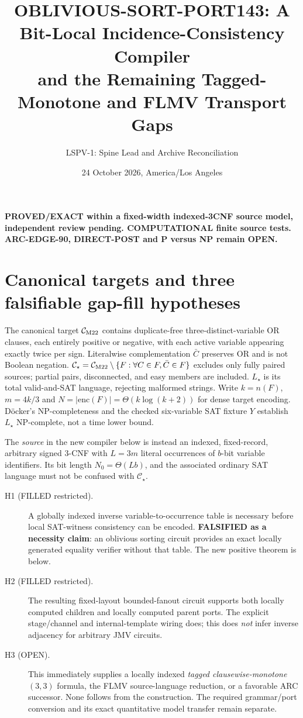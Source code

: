 \documentclass[11pt]{article}
\title{OBLIVIOUS-SORT-PORT143: A Bit-Local Incidence-Consistency Compiler\\
and the Remaining Tagged-Monotone and FLMV Transport Gaps}
\author{LSPV-1: Spine Lead and Archive Reconciliation}
\date{24 October 2026, America/Los Angeles}
\begin{document}
\maketitle
\begin{center}
\textbf{PROVED/EXACT within a fixed-width indexed-3CNF source model, independent review pending. COMPUTATIONAL finite source tests.}\\
\textbf{ARC-EDGE-90, DIRECT-POST and P versus NP remain OPEN.}
\end{center}

\section{Canonical targets and three falsifiable gap-fill hypotheses}
The canonical target $\mathcal C_{\rm M22}$ contains duplicate-free three-distinct-variable OR clauses, each entirely positive or negative, with each active variable appearing exactly twice per sign. Literalwise complementation $\bar C$ preserves OR and is not Boolean negation. $\mathcal C_\star=\mathcal C_{\rm M22}\setminus\{F:\forall C\in F,\bar C\in F\}$ excludes only fully paired sources; partial pairs, disconnected, and easy members are included. $L_\star$ is its total valid-and-SAT language, rejecting malformed strings. Write $k=n(F)$, $m=4k/3$ and $N=|\mathrm{enc}(F)|=\Theta(k\log(k+2))$ for dense target encoding. D\"ocker's NP-completeness and the checked six-variable SAT fixture $Y$ establish $L_\star$ NP-complete, not a time lower bound.

The \emph{source} in the new compiler below is instead an indexed, fixed-record, arbitrary signed 3-CNF with $L=3m$ literal occurrences of $b$-bit variable identifiers. Its bit length $N_0=\Theta(Lb)$, and the associated ordinary SAT language must not be confused with $\mathcal C_\star$.

\begin{description}
\item[H1 (FILLED restricted).] A globally indexed inverse variable-to-occurrence table is necessary before local SAT-witness consistency can be encoded. \textbf{FALSIFIED as a necessity claim}: an oblivious sorting circuit provides an exact locally generated equality verifier without that table. The new positive theorem is below.
\item[H2 (FILLED restricted).] The resulting fixed-layout bounded-fanout circuit supports both locally computed children and locally computed parent ports. The explicit stage/channel and internal-template wiring does; this does \emph{not} infer inverse adjacency for arbitrary JMV circuits.
\item[H3 (OPEN).] This immediately supplies a locally indexed \emph{tagged clausewise-monotone $(3,3)$} formula, the FLMV source-language reduction, or a favorable ARC successor. None follows from the construction. The required grammar/port conversion and its exact quantitative model transfer remain separate.
\end{description}
\end{document}
